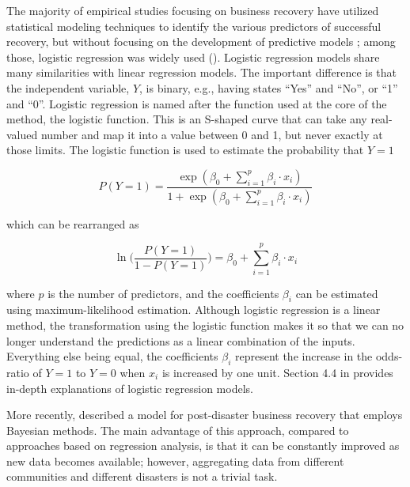 The majority of empirical studies focusing on business recovery have utilized statistical modeling techniques to identify the various predictors of successful recovery, but without focusing on the development of predictive models \citep{aghababaei2020quantifying}; among those, logistic regression was widely used  (\cite{watson2020importance, marshall2015predicting, dahlhamer1998rebounding}). Logistic regression models share many similarities with linear regression models. The important difference is that the independent variable, $Y$, is binary, e.g., having states ``Yes'' and ``No'', or ``1'' and ``0''. Logistic regression is named after the function used at the core of the method, the logistic function. This is an S-shaped curve that can take any real-valued number and map it into a value between 0 and 1, but never exactly at those limits. The logistic function is used to estimate the probability that $Y=1$

\begin{equation}
    P(Y=1) = \frac{\exp(\beta_0 + \sum_{i=1}^{p}\beta_i \cdot x_i)}{1 + \exp(\beta_0 + \sum_{i=1}^{p}\beta_i \cdot x_i)}
    \label{eq:probability}
\end{equation}

\noindent which can be rearranged as

\begin{equation}
    \ln \Bigg(\frac{P(Y=1)}{1-P(Y=1)}\Bigg) = \beta_0 + \sum_{i=1}^{p}\beta_i \cdot x_i 
    \label{eq:logit}
\end{equation}

\noindent where $p$ is the number of predictors, and the coefficients $\beta_i$ can be estimated using maximum-likelihood estimation. Although logistic regression is a linear method, the transformation using the logistic function makes it so that we can no longer understand the predictions as a linear combination of the inputs. Everything else being equal, the coefficients $\beta_i$ represent the increase in the odds-ratio of $Y=1$ to $Y=0$ when $x_i$ is increased by one unit. Section 4.4 in \citet{friedman2001elements} provides in-depth explanations of logistic regression models.\

More recently, \citet{aghababaei2020quantifying} described a model for post-disaster business recovery that employs Bayesian methods. The main advantage of this approach, compared to approaches based on regression analysis, is that it can be constantly improved as new data becomes available; however, aggregating data from different communities and different disasters is not a trivial task.\


